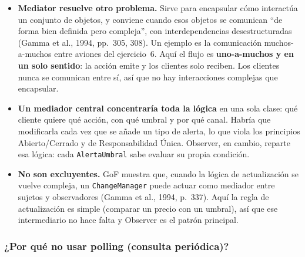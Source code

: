 \begin{itemize}
  \item \textbf{Mediator resuelve otro problema.} Sirve para encapsular cómo interactúa un
        conjunto de objetos, y conviene cuando esos objetos se comunican ``de forma bien
        definida pero compleja'', con interdependencias desestructuradas
        (Gamma et al., 1994, pp.~305, 308). Un ejemplo es la comunicación muchos-a-muchos
        entre aviones del ejercicio~6. Aquí el flujo es \textbf{uno-a-muchos y en un solo
        sentido}: la acción emite y los clientes solo reciben. Los clientes nunca se
        comunican entre sí, así que no hay interacciones complejas que encapsular.
  \item \textbf{Un mediador central concentraría toda la lógica} en una sola clase: qué
        cliente quiere qué acción, con qué umbral y por qué canal. Habría que modificarla cada
        vez que se añade un tipo de alerta, lo que viola los principios Abierto/Cerrado y de
        Responsabilidad Única. Observer, en cambio, reparte esa lógica: cada
        \texttt{AlertaUmbral} sabe evaluar su propia condición.
  \item \textbf{No son excluyentes.} GoF muestra que, cuando la lógica de actualización se
        vuelve compleja, un \texttt{ChangeManager} puede actuar como mediador entre sujetos y
        observadores (Gamma et al., 1994, p.~337). Aquí la regla de actualización es simple
        (comparar un precio con un umbral), así que ese intermediario no hace falta y Observer
        es el patrón principal.
\end{itemize}

\subsubsection{¿Por qué no usar polling (consulta periódica)?}

